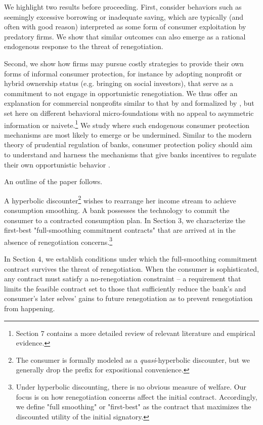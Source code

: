 \documentclass[11pt,english]{article}
\theoremstyle{plain}
\theoremstyle{definition}
\begin{document}
We highlight two results before proceeding. First, consider behaviors such as seemingly excessive borrowing or inadequate saving, which are typically (and often with good reason) interpreted as some form of consumer exploitation by predatory firms. We show that similar outcomes can also emerge as a rational endogenous response to the threat of renegotiation. 

Second, we show how firms may pursue costly strategies to provide their own forms of informal consumer protection, for instance by adopting nonprofit or hybrid ownership status (e.g. bringing on social investors), that serve as a commitment to not engage in opportunistic renegotiation. We thus offer an explanation for commercial nonprofits similar to that by \citet{hansmann1996a} and formalized by \citet{glaeser2001}, but set here on different behavioral micro-foundations with no appeal to asymmetric information or naivete.\footnote{Section 7 contains a more detailed review of relevant literature and empirical evidence.}  We study where such endogenous consumer protection mechanisms are most likely to emerge or be undermined. Similar to the modern theory of prudential regulation of banks, consumer protection policy should aim to understand and harness the mechanisms that give banks incentives to regulate their own opportunistic behavior \citep{dewatripont1999}. 

An outline of the paper follows.

A hyperbolic discounter\footnote{The consumer is formally modeled as a \emph{quasi}-hyperbolic discounter, but we generally drop the prefix for expositional convenience.} wishes to rearrange her income stream to achieve consumption smoothing. A bank possesses the technology to commit the consumer to a contracted consumption plan. In Section 3, we characterize the first-best "full-smoothing commitment contracts" that are arrived at in the absence of renegotiation concerns.\footnote{Under hyperbolic discounting, there is no obvious measure of welfare. Our focus is on how renegotiation concerns affect the initial contract. Accordingly, we define "full smoothing" or "first-best" as the contract that maximizes the discounted utility of the initial signatory.}

In Section 4, we establish conditions under which the full-smoothing commitment contract survives the threat of renegotiation. When the consumer is sophisticated, any contract must satisfy a no-renegotiation constraint -- a requirement that limits the feasible contract set to those that sufficiently reduce the bank's and consumer's later selves' gains to future renegotiation as to prevent renegotiation from happening. 
\end{document}
